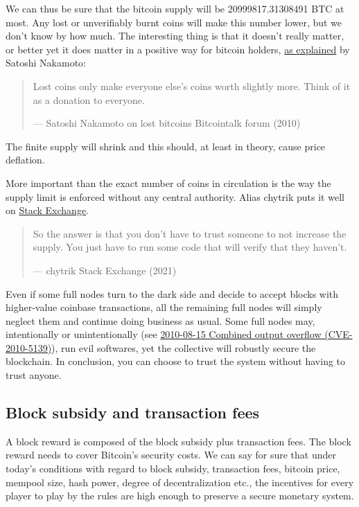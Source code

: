 We can thus be sure that the bitcoin supply will be 20999817.31308491
BTC at most. Any lost or unverifiably burnt coins will make this number
lower, but we don't know by how much. The interesting thing is that it
doesn't really matter, or better yet it does matter in a positive way
for bitcoin holders,
\href{https://bitcointalk.org/index.php?topic=198.msg1647\#msg1647}{as
explained} by Satoshi Nakamoto:

\begin{quote}
Lost coins only make everyone else's coins worth slightly more. Think of
it as a donation to everyone.

---  Satoshi Nakamoto on lost bitcoins Bitcointalk forum (2010)
\end{quote}

The finite supply will shrink and this should, at least in theory, cause
price deflation.

More important than the exact number of coins in circulation is the way
the supply limit is enforced without any central authority. Alias
chytrik puts it well on
\href{https://bitcoin.stackexchange.com/a/106830/69518}{Stack Exchange}.

\begin{quote}
So the answer is that you don't have to trust someone to not increase
the supply. You just have to run some code that will verify that they
haven't.

---  chytrik Stack Exchange (2021)
\end{quote}

Even if some full nodes turn to the dark side and decide to accept
blocks with higher-value coinbase transactions, all the remaining full
nodes will simply neglect them and continue doing business as usual.
Some full nodes may, intentionally or unintentionally (see
\protect\hyperlink{combined-output-overflow}{2010-08-15 Combined output
overflow (CVE-2010-5139)}), run evil softwares, yet the collective will
robustly secure the blockchain. In conclusion, you can choose to trust
the system without having to trust anyone.

\hypertarget{_block_subsidy_and_transaction_fees}{%
\subsection{Block subsidy and transaction
fees}\label{_block_subsidy_and_transaction_fees}}

A block reward is composed of the block subsidy plus transaction fees.
The block reward needs to cover Bitcoin's security costs. We can say for
sure that under today's conditions with regard to block subsidy,
transaction fees, bitcoin price, mempool size, hash power, degree of
decentralization etc., the incentives for every player to play by the
rules are high enough to preserve a secure monetary system.

